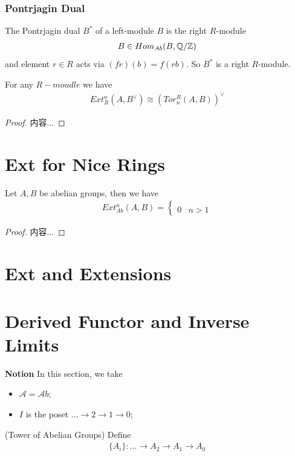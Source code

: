 \documentclass[Total.tex]{subfiles}
\begin{document}
			\subsubsection{Pontrjagin Dual}
			\begin{Def}
				The Pontrjagin dual $B^*$ of a left-module $B$ is the right $R$-module 
				\begin{gather*}
					B\in Hom_{Ab}(B,\mathbb{Q}/\mathbb{Z})
				\end{gather*}
				and element $r\in R$ acts via $(fr)(b)=f(rb)$. So $B^*$ is a right $R$-module.
			\end{Def}
			
			\begin{theorem}
				For any $R-moudle$ we have
				\begin{gather*}
					Ext^n_R(A,B^\vee)\cong (Tor_n^R(A,B))^\vee
				\end{gather*}
			\end{theorem}
			\begin{proof}
				内容...
			\end{proof}
		\section{Ext for Nice Rings}
			\begin{lemma}
				Let $A,B$ be abelian groups, then we have
				\begin{gather*}
					Ext^n_{Ab}(A,B)=\begin{cases}
						\\
						0&n>1
					\end{cases}
				\end{gather*}
			\end{lemma}
			\begin{proof}
				内容...
			\end{proof}
		\section{Ext and Extensions}
		\section{Derived Functor and Inverse Limits}
			\textbf{Notion} In this section, we take
			\begin{itemize}
				\item $\mathcal{A}={\mathcal Ab}$;
				\item $I$ is the poset $\dots\rightarrow 2\rightarrow 1\rightarrow 0$;
			\end{itemize}
			\begin{Def}
				(Tower of Abelian Groups) Define
				\begin{gather*}
					\{A_i\}:\dots\rightarrow A_2\rightarrow A_1\rightarrow A_0
				\end{gather*}
			\end{Def}
			
\end{document}
